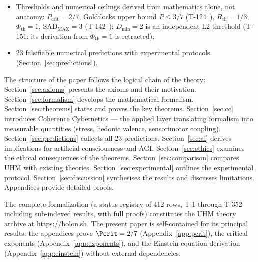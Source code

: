 \begin{itemize}[leftmargin=2em]
        spectra on the Pareto sphere $P = 2/7$ (T-222~, restated;
        the earlier claim that $\rho^* = \varphi(\Gamma)$ is a Pareto-optimal
        fixed point is retracted); and Putnam-triviality
        / Lerchner's Melody Paradox is foreclosed by the three-level
        L1/L2/L3 ontology with $G_2$-gauge boundedness (T-223~);
  \item Thresholds and numerical ceilings derived from mathematics alone, not
        anatomy: $P_{\mathrm{crit}} = 2/7$, Goldilocks upper bound
        $P \leq 3/7$ (T-124~), $R_{\mathrm{th}} = 1/3$,
        $\Phi_{\mathrm{th}} = 1$, $\mathrm{SAD}_{\mathrm{MAX}} = 3$
        (T-142~); $D_{\min} = 2$ is an independent L2 threshold
         (T-151: its derivation from $\Phi_{\mathrm{th}} = 1$ is
        retracted);
  \item 23 falsifiable numerical predictions with experimental protocols
        (Section~\ref{sec:predictions}).
\end{itemize}

The structure of the paper follows the logical chain of the theory:
Section~\ref{sec:axioms} presents the axioms and their motivation.
Section~\ref{sec:formalism} develops the mathematical formalism.
Section~\ref{sec:theorems} states and proves the key theorems.
Section~\ref{sec:cc} introduces Coherence Cybernetics --- the applied layer translating
formalism into measurable quantities (stress, hedonic valence, sensorimotor coupling).
Section~\ref{sec:predictions} collects all 23 predictions.
Section~\ref{sec:ai} derives implications for artificial consciousness and AGI.
Section~\ref{sec:ethics} examines the ethical consequences of the theorems.
Section~\ref{sec:comparison} compares UHM with existing theories.
Section~\ref{sec:experimental} outlines the experimental protocol.
Section~\ref{sec:discussion} synthesises the results and discusses limitations.
Appendices provide detailed proofs.

The complete formalization (a status registry of 412 rows, T-1 through
T-352 including sub-indexed results, with full proofs) constitutes the UHM theory archive
at \url{https://holon.sh}. The present paper is self-contained for its
principal results: the appendices
prove $\Pcrit = 2/7$ (Appendix~\ref{app:pcrit}), the critical exponents
(Appendix~\ref{app:exponents}), and the Einstein-equation derivation
(Appendix~\ref{app:einstein}) without external dependencies.

